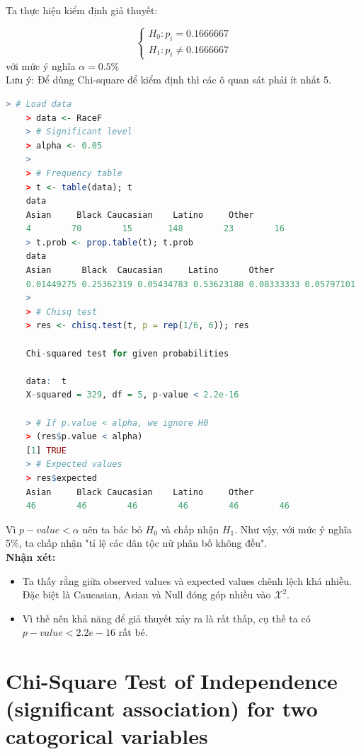 \documentclass[a4paper,12pt]{article}
\begin{document}
	Ta thực hiện kiểm định giả thuyết:
	
	\begin{equation*}
	\begin{cases}
	H_0: p_i = 0.1666667\\
	H_1: p_i \neq 0.1666667
	\end{cases}
	\end{equation*}
	với mức ý nghĩa $\alpha = 0.5\%$\\
	
	Lưu ý: Để dùng Chi-square để kiểm định thì các ô quan sát phải ít nhất 5.\\
	
	\begin{lstlisting}[language=R]
	> # Load data
	> data <- RaceF
	> # Significant level
	> alpha <- 0.05
	> 
	> # Frequency table
	> t <- table(data); t
	data
	Asian     Black Caucasian    Latino     Other 
	4        70        15       148        23        16 
	> t.prob <- prop.table(t); t.prob
	data
	Asian      Black  Caucasian     Latino      Other 
	0.01449275 0.25362319 0.05434783 0.53623188 0.08333333 0.05797101 
	> 
	> # Chisq test
	> res <- chisq.test(t, p = rep(1/6, 6)); res
	
	Chi-squared test for given probabilities
	
	data:  t
	X-squared = 329, df = 5, p-value < 2.2e-16
	
	> # If p.value < alpha, we ignore H0
	> (res$p.value < alpha)
	[1] TRUE
	> # Expected values
	> res$expected
	Asian     Black Caucasian    Latino     Other 
	46        46        46        46        46        46 
	\end{lstlisting}
	
	Vì $p-value < \alpha$ nên ta bác bỏ $H_0$ và chấp nhận $H_1$. Như vậy, với mức ý nghĩa 5\%, ta chấp nhận "tỉ lệ các dân tộc nữ phân bố không đều".\\
	
	
	\textbf{Nhận xét:}
	\begin{itemize}
		\item Ta thấy rằng giữa observed values và expected values chênh lệch khá nhiều. Đặc biệt là Caucasian, Asian và Null đóng góp nhiều vào $\mathcal{X}^2$.
		\item Vì thế nên khả năng để giả thuyết xảy ra là rất thấp, cụ thế ta có $p-value < 2.2e-16$ rất bé.
	\end{itemize}
		
	\section{Chi-Square Test of Independence (significant association) for two catogorical variables}
	
\end{document}
